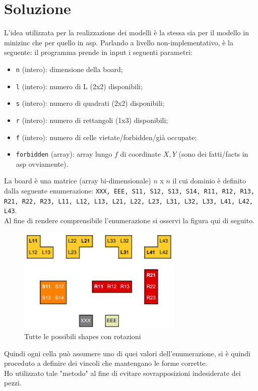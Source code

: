 \documentclass{article}
\begin{document}
\section{Soluzione}
L'idea utilizzata per la realizzazione dei modelli è la stessa sia per il modello in minizinc che per quello in asp. Parlando a livello non-implementativo, è la seguente: il programma prende in input i seguenti parametri:
\begin{itemize}
    \item \texttt{n} (intero): dimensione della board;
    \item \texttt{l} (intero): numero di L (2x2) disponibili;
    \item \texttt{s} (intero): numero di quadrati (2x2) disponibili;
    \item \texttt{r} (intero): numero di rettangoli (1x3) disponibili;
    \item \texttt{f} (intero): numero di celle vietate/forbidden/già occupate;
    \item \texttt{forbidden} (array): array lungo $f$ di coordinate $X,Y$ (sono dei fatti/facts in asp ovviamente).
\end{itemize}
La board è una matrice (array bi-dimensionale) $n$ x $n$ il cui dominio è definito dalla seguente enumerazione: \texttt{XXX, EEE, S11, S12, S13, S14, R11, R12, R13, R21, R22, R23, L11, L12, L13, L21, L22, L23, L31, L32, L33, L41, L42, L43}.\\
Al fine di rendere comprensibile l'enumerazione si osservi la figura qui di seguito.\\
\begin{figure}[ht!]
    \centering
    \includegraphics[width=0.7\textwidth]{shapes}
    \caption{Tutte le possibili shapes con rotazioni}
\end{figure}
Quindi ogni cella può assumere uno di quei valori dell'enumerazione, si è quindi proceduto a definire dei vincoli che mantengano le forme corrette.\\
Ho utilizzato tale "metodo" al fine di evitare sovrapposizioni indesiderate dei pezzi. \\
\end{document}
